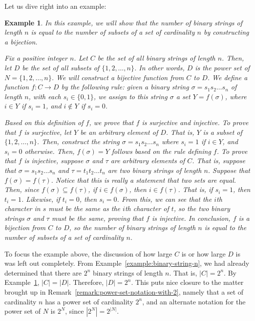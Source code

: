 \documentclass{book}
\newcounter{ekcounter}%
\theoremstyle{ekimcustom}
\newtheorem{example}[ekcounter]{Example}
\begin{document}
Let us dive right into an example:
\begin{example}\label{example:first-counting-by-bijection}
In this example, we will show that the number of binary strings of length $n$ is equal to the number of subsets of a set of cardinality $n$ by constructing a bijection.

Fix a positive integer $n$. Let $C$ be the set of all binary strings of length $n$. Then, let $D$ be the set of all subsets of $\{1,2,\dots,n\}$. In other words, $D$ is the power set of $N=\{1,2,\dots,n\}$. We will construct a bijective function from $C$ to $D$. We define a function $f : C \to D$ by the following rule: given a binary string $\sigma = s_1s_2\dots s_n$ of length $n$, with each $s_i \in \{0,1\}$, we assign to this string $\sigma$ a set $Y = f(\sigma)$, where $i \in Y$ if $s_i = 1$, and $i \not\in Y$ if $s_i = 0$.

Based on this definition of $f$, we prove that $f$ is surjective and injective. To prove that $f$ is surjective, let $Y$ be an arbitrary element of $D$. That is, $Y$ is a subset of $\{1,2,\dots,n\}$. Then, construct the string $\sigma = s_1s_2\dots s_n$ where $s_i=1$ if $i \in Y$, and $s_i = 0$ otherwise. Then, $f(\sigma) = Y$ follows based on the rule defining $f$. To prove that $f$ is injective, suppose $\sigma$ and $\tau$ are arbitrary elements of $C$. That is, suppose that $\sigma = s_1s_2\dots s_n$ and $\tau = t_1t_2\dots t_n$ are two binary strings of length $n$. Suppose that $f(\sigma)=f(\tau)$. Notice that this is really a statement that two sets are equal. Then, since $f(\sigma) \subseteq f(\tau)$, if $i \in f(\sigma)$, then $i \in f(\tau)$. That is, if $s_i = 1$, then $t_i = 1$. Likewise, if $t_i = 0$, then $s_i=0$. From this, we can see that the $i$th character in $s$ must be the same as the $i$th character of $t$, so the two binary strings $\sigma$ and $\tau$ must be the same, proving that $f$ is injective. In conclusion, $f$ is a bijection from $C$ to $D$, so the number of binary strings of length $n$ is equal to the number of subsets of a set of cardinality $n$.
\end{example}
To focus the example above, the discussion of how large $C$ is or how large $D$ is was left out completely. From Example~\ref{example:binary-string-n}, we had already determined that there are $2^n$ binary strings of length $n$. That is, $|C|=2^n$. By Example~\ref{example:first-counting-by-bijection}, $|C|=|D|$. Therefore, $|D|=2^n$. This puts nice closure to the matter brought up in Remark~\ref{remark:power-set-notation-with-2}, namely that a set of cardinality $n$ has a power set of cardinality $2^n$, and an alternate notation for the power set of $N$ is $2^N$, since $|2^N|=2^{|N|}$.
\end{document}
